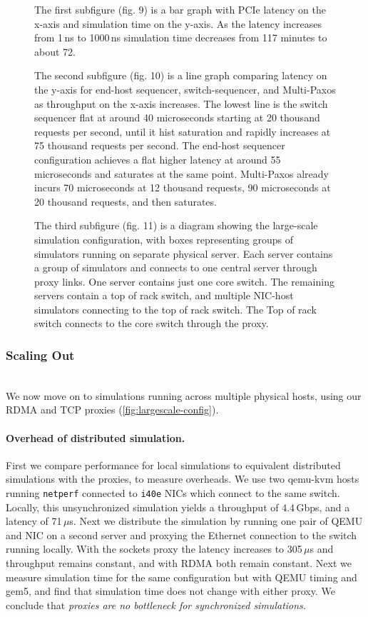 \begin{figure}
{  The first subfigure (fig. 9) is a bar graph with PCIe latency on the
  x-axis and simulation time on the y-axis. As the latency increases
  from 1\,ns to 1000\,ns simulation time decreases from 117 minutes to
  about 72.

  The second subfigure (fig. 10) is a line graph comparing latency on
  the y-axis for end-host sequencer, switch-sequencer, and Multi-Paxos
  as throughput on the x-axis increases. The lowest line is the switch
  sequencer flat at around 40 microseconds starting at 20 thousand
  requests per second, until it hist saturation and rapidly increases
  at 75 thousand requests per second. The end-host sequencer
  configuration achieves a flat higher latency at around 55
  microseconds and saturates at the same point. Multi-Paxos already
  incurs 70 microseconds at 12 thousand requests, 90 microseconds at
  20 thousand requests, and then saturates.

  The third subfigure (fig. 11) is a diagram showing the large-scale
  simulation configuration, with boxes representing groups of
  simulators running on separate physical server. Each server contains
  a group of simulators and connects to one central server through
  proxy links. One server contains just one core switch. The remaining
  servers contain a top of rack switch, and multiple NIC-host
  simulators connecting to the top of rack switch. The Top of rack
  switch connects to the core switch through the proxy.}%
\end{figure}


\subsubsection{Scaling Out}\hfill\\
%
We now move on to \sysname simulations running across
multiple physical hosts, using our RDMA and TCP proxies
(\autoref{fig:largescale-config}).

\paragraph{Overhead of distributed simulation.}
First we compare performance for local simulations to equivalent
distributed simulations with the \sysname proxies, to measure
overheads.
%
We use two qemu-kvm hosts running \texttt{netperf} connected to
\texttt{i40e} NICs which connect to the same switch.
%
Locally, this unsynchronized simulation yields a throughput of
4.4\,Gbps, and a latency of 71\,$\mu$s.
%
Next we distribute the simulation by running one pair of QEMU and NIC
on a second server and proxying the Ethernet connection to the switch
running locally.
%
With the sockets proxy the latency increases to 305\,$\mu$s and
throughput remains constant, and with RDMA both remain constant.
%
Next we measure simulation time for the same configuration but with
QEMU timing and gem5, and find that simulation time does not change
with either proxy.
%
We conclude that \emph{\sysname proxies are no bottleneck for
synchronized simulations.}

